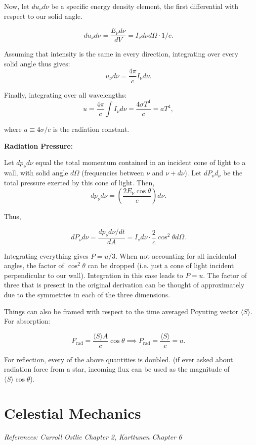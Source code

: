 \documentclass[12pt]{article}
\newcommand{\V}{

\vspace{\baselineskip}

}
\begin{document}
Now, let $du_{\nu}d\nu$ be a specific energy density element, the first differential with respect to our solid angle. 

\[du_{\nu}d\nu = \frac{E_{\nu}d\nu}{dV} = I_{\nu}d\nu d\Omega \cdot 1/c.\]

Assuming that intensity is the same in every direction, integrating over every solid angle thus gives: 
\[u_{\nu}d\nu = \frac{4\pi}{c}I_{\nu}d\nu.\]

Finally, integrating over all wavelengths: 
\[u = \frac{4\pi}{c}\int I_{\nu}d\nu = \frac{4\sigma T^4}{c} = aT^4,\]

where $a \equiv 4\sigma/c$ is the radiation constant.\V

\textbf{Radiation Pressure:}

Let $dp_{\nu}d\nu$ equal the total momentum contained in an incident cone of light to a wall, with solid angle $d\Omega$ (frequencies between $\nu$ and $\nu + d\nu$). Let $dP_{\nu}d_{\nu}$ be the total pressure exerted by this cone of light. Then, 
\[dp_{\nu}d\nu = \left(\frac{2E_{\nu}\cos{\theta}}{c}\right)d\nu.\]

Thus, 

\[dP_{\nu}d\nu = \frac{dp_{\nu}d\nu/dt}{dA} = I_{\nu}d\nu\cdot \frac{2}{c}\cos^2{\theta}d\Omega.\]

Integrating everything gives $P = u/3$. When not accounting for all incidental angles, the factor of $\cos^2{\theta}$ can be dropped (i.e. just a cone of light incident perpendicular to our wall). Integration in this case leads to $P = u$. The factor of three that is present in the original derivation can be thought of approximately due to the symmetries in each of the three dimensions.

Things can also be framed with respect to the time averaged Poynting vector $\langle S\rangle$. For absorption:

\[F_{\text{rad}} = \frac{\langle S\rangle A}{c}\cos{\theta} \implies P_{\text{rad}} = \frac{\langle S\rangle}{c} = u.\]

For reflection, every of the above quantities is doubled. (if ever asked about radiation force from a star, incoming flux can be used as the magnitude of $\langle S\rangle\cos{\theta}$).

\newpage
\section{Celestial Mechanics}

\textit{References: Carroll Ostlie Chapter 2, Karttunen Chapter 6}
\end{document}
